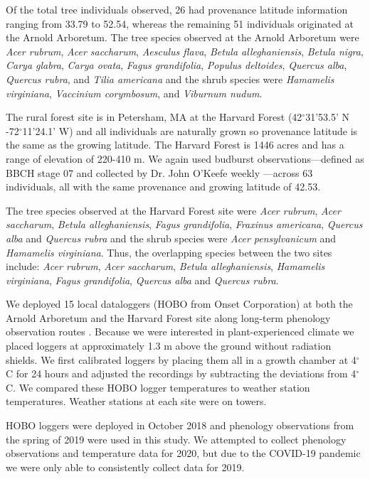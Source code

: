 \documentclass{article}\usepackage[]{graphicx}\usepackage[]{color}
\begin{document}
Of the total tree individuals observed, 26 had provenance latitude information ranging from 33.79 to 52.54, whereas the remaining 51 individuals originated at the Arnold Arboretum. The tree species observed at the Arnold Arboretum were \textit{Acer rubrum}, \textit{Acer saccharum}, \textit{Aesculus flava}, \textit{Betula alleghaniensis}, \textit{Betula nigra}, \textit{Carya glabra}, \textit{Carya ovata}, \textit{Fagus grandifolia}, \textit{Populus deltoides}, \textit{Quercus alba}, \textit{Quercus rubra}, and \textit{Tilia americana} and the shrub species were \textit{Hamamelis virginiana}, \textit{Vaccinium corymbosum}, and \textit{Viburnum nudum}. 

The rural forest site is in Petersham, MA at the Harvard Forest (42$^{\circ}$31'53.5' N -72$^{\circ}$11'24.1' W) and all individuals are naturally grown so provenance latitude is the same as the growing latitude. The Harvard Forest is 1446 acres and has a range of elevation of 220-410 m. We again used budburst observations---defined as BBCH stage 07 and collected by Dr. John O'Keefe weekly \citep{OKeefe2014}---across 63 individuals, all with the same provenance and growing latitude of 42.53. 

The tree species observed at the Harvard Forest site were \textit{Acer rubrum}, \textit{Acer saccharum}, \textit{Betula alleghaniensis},  \textit{Fagus grandifolia}, \textit{Fraxinus americana}, \textit{Quercus alba} and \textit{Quercus rubra} and the shrub species were \textit{Acer pensylvanicum} and \textit{Hamamelis virginiana}. Thus, the overlapping species between the two sites include: \textit{Acer rubrum}, \textit{Acer saccharum}, \textit{Betula alleghaniensis}, \textit{Hamamelis virginiana}, \textit{Fagus grandifolia}, \textit{Quercus alba} and \textit{Quercus rubra}.

We deployed 15 local dataloggers (HOBO from Onset Corporation) at both the Arnold Arboretum and the Harvard Forest site along long-term phenology observation routes \citep{OKeefe2014, Denny2014}. Because we were interested in plant-experienced climate we placed loggers at approximately 1.3 m above the ground without radiation shields. We first calibrated loggers by placing them all in a growth chamber at 4$^{\circ}$C for 24 hours and adjusted the recordings by subtracting the deviations from 4$^{\circ}$C. We compared these HOBO logger temperatures to weather station temperatures. Weather stations at each site were on towers.

HOBO loggers were deployed in October 2018 and phenology observations from the spring of 2019 were used in this study. We attempted to collect phenology observations and temperature data for 2020, but due to the COVID-19 pandemic we were only able to consistently collect data for 2019. 
\end{document}
